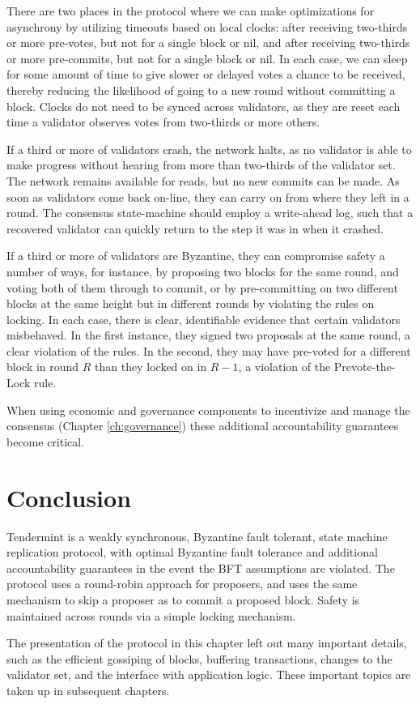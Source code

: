 There are two places in the protocol where we can make optimizations for asynchrony by utilizing timeouts based on local clocks:
after receiving two-thirds or more pre-votes, but not for a single block or nil, and after receiving two-thirds or more pre-commits, 
but not for a single block or nil.
In each case, we can sleep for some amount of time to give slower or delayed votes a chance to be received,
thereby reducing the likelihood of going to a new round without committing a block.
Clocks do not need to be synced across validators, as they are reset each time a validator observes votes from two-thirds or more others.

If a third or more of validators crash, the network halts, 
as no validator is able to make progress without hearing from more than two-thirds of the validator set.
The network remains available for reads, but no new commits can be made.
As soon as validators come back on-line, they can carry on from where they left in a round. 
The consensus state-machine should employ a write-ahead log,
such that a recovered validator can quickly return to the step it was in when it crashed.

If a third or more of validators are Byzantine, they can compromise safety a number of ways, 
for instance, by proposing two blocks for the same round, and voting both of them through to commit, 
or by pre-committing on two different blocks at the same height but in different rounds by violating the rules on locking.
In each case, there is clear, identifiable evidence that certain validators misbehaved. 
In the first instance, they signed two proposals at the same round, a clear violation of the rules.
In the second, they may have pre-voted for a different block in round $R$ than they locked on in $R-1$, 
a violation of the Prevote-the-Lock rule.

When using economic and governance components to incentivize and manage the consensus (Chapter  \ref{ch:governance})
these additional accountability guarantees become critical.

\section{Conclusion}

Tendermint is a weakly synchronous, Byzantine fault tolerant, state machine replication protocol,
with optimal Byzantine fault tolerance and additional accountability guarantees in the event
the BFT assumptions are violated. 
The protocol uses a round-robin approach for proposers, and uses the same mechanism to skip a proposer as to commit a proposed block.
Safety is maintained across rounds via a simple locking mechanism.

The presentation of the protocol in this chapter left out many important details, 
such as the efficient gossiping of blocks, buffering transactions, changes to the validator set, 
and the interface with application logic. These important topics are taken up in subsequent chapters.


